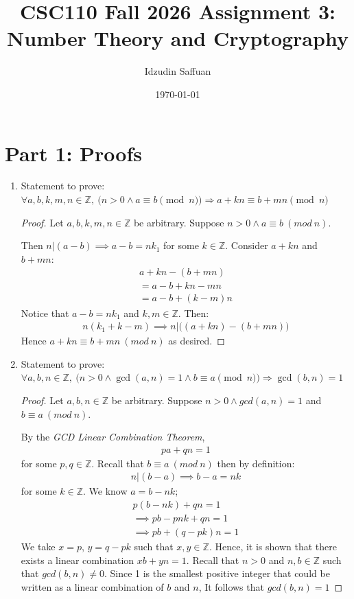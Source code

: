\documentclass[11pt]{article}
\title{CSC110 Fall 2026 Assignment 3: Number Theory and Cryptography}
\author{Idzudin Saffuan}
\date{\today}
\begin{document}
\maketitle


\section*{Part 1: Proofs}

\begin{enumerate}
\item[1.] Statement to prove:
$\forall a, b, k, m, n \in \mathbb{Z},~
\big(n > 0 \land a \equiv b \pmod n \big) \Rightarrow
a + kn \equiv b + mn \pmod n$

\begin{proof}
Let $a, b, k, m, n \in \mathbb{Z}$ be arbitrary. Suppose $n > 0 \wedge a \equiv b \ (mod\ n)$.

Then $n |(a-b) \implies a - b = nk_1$ for some $k \in \mathbb{Z}$. Consider $a +kn$ and $b + mn$:
\begin{align*}
a+kn - (b +mn) \\
= a-b + kn - mn \\
= a-b +(k-m)n
\end{align*}
Notice that $a-b = nk_1$ and $k, m \in \mathbb{Z}$. Then:
\begin{align*}
n(k_1+k-m) \implies n|\big((a+kn)-(b+mn)\big)
\end{align*}
Hence $a + kn \equiv b + mn \ (mod\ n)$ as desired.
\end{proof}

\newpage

\item[2.] Statement to prove:
$\forall a, b, n \in \mathbb{Z},~
\big(n > 0 \land \gcd(a, n) = 1 \land b \equiv a \pmod n \big) \Rightarrow
\gcd(b, n) = 1$

\begin{proof}
Let $a, b, n \in \mathbb{Z}$ be arbitrary. Suppose $n>0 \wedge gcd(a,n) =1$ and $ b \equiv a \ (mod \ n)$.

By the \textit{GCD Linear Combination Theorem},
\begin{align*}
pa + qn = 1
\end{align*}
for some $p, q \in \mathbb{Z}$. Recall that $ b \equiv a \ (mod \ n)$ then by definition:
\begin{align*}
n|(b-a) \implies b-a = nk
\end{align*}
for some $k \in \mathbb{Z}$. We know $ a= b-nk$;
\begin{align*}
p(b-nk) + qn = 1 \\
\implies pb - pnk + qn = 1 \\
\implies pb + (q-pk)n = 1
\end{align*}
We take $x=p$, $y = q-pk$ such that $x,y \in \mathbb{Z}$. Hence, it is shown that there exists a linear combination $xb +yn =1$. Recall that $n > 0$ and $n,b \in \mathbb{Z}$ such that $gcd(b,n) \neq  0$. Since 1 is the smallest positive integer that could be written as a linear combination of $b$ and $n$, It follows that $gcd(b,n) = 1$
\end{proof}


\end{enumerate}
\end{document}
